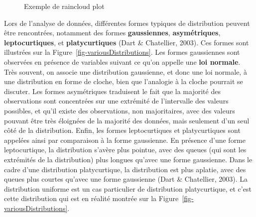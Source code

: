 \documentclass[
  letterpaper,
]{book}
\begin{document}
\begin{figure}[H]


\caption{\label{fig-raincloudUnivar}Exemple de raincloud plot}

\end{figure}%

Lors de l'analyse de données, différentes formes typiques de
distribution peuvent être rencontrées, notamment des formes
\textbf{gaussiennes}, \textbf{asymétriques}, \textbf{leptocurtiques}, et
\textbf{platycurtiques} (Dart \& Chatellier, 2003). Ces formes sont
illustrées sur la Figure~\ref{fig-variousDistributions}. Les formes
gaussiennes sont observées en présence de variables suivant ce qu'on
appelle une \textbf{loi normale}. Très souvent, on associe une
distribution gaussienne, et donc une loi normale, à une distribution en
forme de cloche, bien que l'analogie à la cloche pourrait se discuter.
Les formes asymétriques traduisent le fait que la majorité des
observations sont concentrées sur une extrémité de l'intervalle des
valeurs possibles, et qu'il existe des observations, non majoritaires,
avec des valeurs pouvant être très éloignées de la majorité des données,
mais seulement d'un seul côté de la distribution. Enfin, les formes
leptocurtiques et platycurtiques sont appelées ainsi par comparaison à
la forme gaussienne. En présence d'une forme leptocurtique, la
distribution s'avère plus pointue, avec des queues (qui sont les
extrémités de la distribution) plus longues qu'avec une forme
gaussienne. Dans le cadre d'une distribution platycurtique, la
distribution est plus aplatie, avec des queues plus courtes qu'avec une
forme gaussienne (Dart \& Chatellier, 2003). La distribution uniforme
est un cas particulier de distribution platycurtique, et c'est cette
distribution qui est en réalité montrée sur la
Figure~\ref{fig-variousDistributions}.
\end{document}

